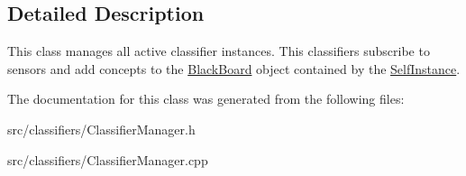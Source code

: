 \subsection{Detailed Description}
This class manages all active classifier instances. This classifiers subscribe to sensors and add concepts to the \hyperlink{class_black_board}{Black\+Board} object contained by the \hyperlink{class_self_instance}{Self\+Instance}. 

The documentation for this class was generated from the following files\+:\begin{DoxyCompactItemize}
\item 
src/classifiers/Classifier\+Manager.\+h\item 
src/classifiers/Classifier\+Manager.\+cpp\end{DoxyCompactItemize}
